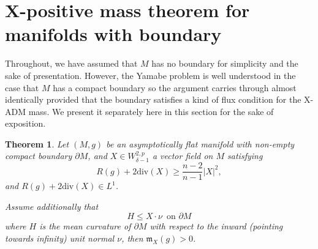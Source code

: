 \documentclass[a4paper,11pt,reqno]{amsart}
\theoremstyle{plain}
\newtheorem{thm}{Theorem}[section]
\theoremstyle{definition}
\theoremstyle{remark}
\newcommand{\m}{\mathfrak{m}}
\numberwithin{equation}{section}
\begin{document}
\section{X-positive mass theorem for manifolds with boundary}
Throughout, we have assumed that $M$ has no boundary for simplicity and the sake of presentation. However, the Yamabe problem is well understood in the case that $M$ has a compact boundary so the argument carries through almost identically provided that the boundary satisfies a kind of flux condition for the X-ADM mass. We present it separately here in this section for the sake of exposition.



\begin{thm}\label{thm-boundary}
	Let $(M,g)$ be an asymptotically flat manifold with non-empty compact boundary $\partial M$, and $X\in W^{2,p}_{\delta-1}$ a vector field on $M$ satisfying
	\begin{equation} 
		R(g)+ 2\mathrm{div}(X)\geq\frac{n-2}{n-1}|X|^2,
	\end{equation}
	and $R(g)+ 2\mathrm{div}(X)\in L^1$.
	
	Assume additionally that
	\begin{equation}\label{eq-boundcond}
		H\leq X\cdot\nu\,\text{ on }\partial M
	\end{equation}
	where $H$ is the mean curvature of $\partial M$ with respect to the inward (pointing towards infinity) unit normal $\nu$,
	then $\m_X(g)>0$.
\end{thm}
\end{document}
